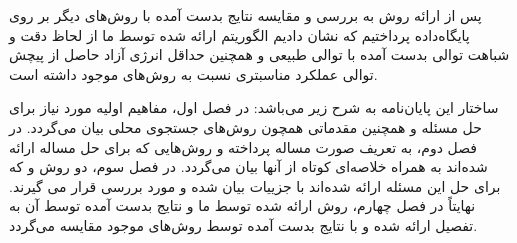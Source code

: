 {پس از ارائه روش به بررسی و مقایسه نتایج بدست آمده با روش‌های دیگر بر روی پایگاه‌داده \cite{rfam} پرداختیم که نشان دادیم الگوریتم ارائه شده توسط ما از لحاظ دقت و شباهت توالی بدست آمده با توالی طبیعی و همچنین حداقل انرژی آزاد حاصل از پیچش توالی عملکرد مناسبتری نسبت به روش‌های موجود داشته است.

ساختار این پایان‌نامه به شرح زیر می‌باشد:
در فصل اول، مفاهیم اولیه مورد نیاز برای حل مسئله و همچنین مقدماتی همچون روش‌های جستجوی محلی بیان می‌گردد. در فصل دوم، به تعریف صورت مساله پرداخته و روش‌هایی که برای حل مساله ارائه شده‌اند به همراه خلاصه‌ای کوتاه از آنها بیان می‌گردد. در فصل سوم، دو روش  \cite{nupack} و \cite{global} که برای حل این مسئله ارائه شده‌اند با جزییات بیان شده و مورد بررسی قرار می گیرند. نهایتاً در فصل چهارم، روش ارائه شده توسط ما و نتایج بدست آمده توسط آن به تفصیل ارائه شده و با نتایج بدست آمده توسط روش‌های موجود مقایسه می‌گردد.

 \par}